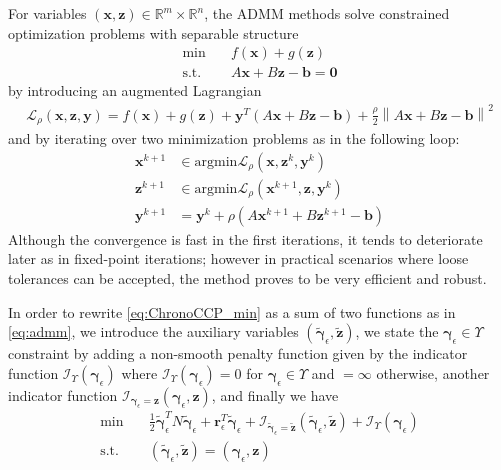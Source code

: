 \documentclass{svproc}
\newcommand{\vect}[1]{\bm{#1}}
\newcommand{\norm}[1]{\left\lVert#1\right\rVert}
\begin{document}
For variables $(\vect{x},\vect{z}) \in \mathbb{R}^m \times \mathbb{R}^n$, the ADMM methods solve constrained optimization problems with separable structure
\begin{subequations}
	\begin{align}
    \text{min} \quad  & f(\vect{x}) + g(\vect{z}) \\
	  \text{s.t.} \quad &  A \vect{x} + B \vect{z} - \vect{b} = \vect{0}
	\end{align}
	\label{eq:admm}
\end{subequations}
by introducing an augmented Lagrangian
\begin{align}
\mathcal{L}_{\rho}(\vect{x},\vect{z},\vect{y})= f(\vect{x}) + g(\vect{z}) + \vect{y}^T (A \vect{x} + B \vect{z} - \vect{b}) + \frac{\rho}{2} \norm{A \vect{x} + B \vect{z} - \vect{b}}^2
\end{align}
and by iterating over two minimization problems as in the following loop:
\begin{align}
 \vect{x}^{k+1} &\in \text{argmin} \mathcal{L}_{\rho}(\vect{x},\vect{z}^k,\vect{y}^k) \\
 \vect{z}^{k+1} &\in \text{argmin} \mathcal{L}_{\rho}(\vect{x}^{k+1},\vect{z},\vect{y}^k) \\
 \vect{y}^{k+1} &= \vect{y}^{k} + \rho ( A \vect{x}^{k+1} + B \vect{z}^{k+1} - \vect{b} )
 \label{eq:admm_iters}
\end{align}
Although the convergence is fast in the first iterations, it tends to deteriorate later as in fixed-point iterations; however in practical scenarios where loose tolerances can be accepted, the method proves to be very efficient and robust.

In order to rewrite \eqref{eq:ChronoCCP_min} as a sum of two functions as in \eqref{eq:admm}, we introduce the auxiliary variables 
$(\tilde{\vect{\gamma}}_\epsilon,\tilde{\vect{z}})$, 
we state the $\vect{\gamma}_\epsilon \in \Upsilon$ constraint by adding a non-smooth penalty function given by the indicator function 
$\mathcal{I}_\Upsilon (\vect{\gamma}_\epsilon)$ 
where $\mathcal{I}_\Upsilon(\vect{\gamma}_\epsilon)=0$ for $\vect{\gamma}_\epsilon \in \Upsilon$ and $=\infty$ otherwise, another indicator function 
$\mathcal{I}_{\vect{\gamma}_\epsilon = \vect{z}}(\vect{\gamma}_\epsilon,\vect{z})$,
and finally we have
\begin{subequations}
	\begin{align}
    \text{min} \quad & \frac{1}{2} \tilde{\vect{\gamma}}_\epsilon^T N \tilde{\vect{\gamma}}_\epsilon + \vect{r}^T_\epsilon \tilde{\vect{\gamma}}_\epsilon  +  \mathcal{I}_{\tilde{\vect{\gamma}}_\epsilon = \tilde{\vect{z}}}(\tilde{\vect{\gamma}}_\epsilon,\tilde{\vect{z}}) +  \mathcal{I}_\Upsilon(\vect{\gamma}_\epsilon)  \\
	  \text{s.t.} \quad & (\tilde{\vect{\gamma}}_\epsilon,\tilde{\vect{z}})  =  (\vect{\gamma}_\epsilon,\vect{z})
	\end{align}
	\label{eq:admm_mod}
\end{subequations}
\end{document}
